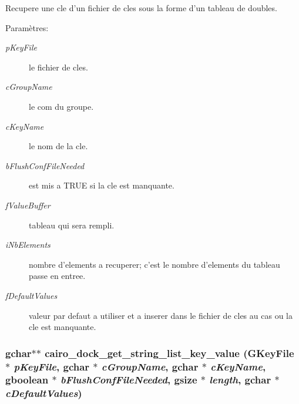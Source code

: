 Recupere une cle d'un fichier de cles sous la forme d'un tableau de doubles. \begin{Desc}
\item[Param\`{e}tres:]
\begin{description}
\item[{\em p\-Key\-File}]le fichier de cles. \item[{\em c\-Group\-Name}]le com du groupe. \item[{\em c\-Key\-Name}]le nom de la cle. \item[{\em b\-Flush\-Conf\-File\-Needed}]est mis a TRUE si la cle est manquante. \item[{\em f\-Value\-Buffer}]tableau qui sera rempli. \item[{\em i\-Nb\-Elements}]nombre d'elements a recuperer; c'est le nombre d'elements du tableau passe en entree. \item[{\em f\-Default\-Values}]valeur par defaut a utiliser et a inserer dans le fichier de cles au cas ou la cle est manquante. \end{description}
\end{Desc}
\subsubsection{\setlength{\rightskip}{0pt plus 5cm}gchar$\ast$$\ast$ cairo\_\-dock\_\-get\_\-string\_\-list\_\-key\_\-value (GKey\-File $\ast$ {\em p\-Key\-File}, gchar $\ast$ {\em c\-Group\-Name}, gchar $\ast$ {\em c\-Key\-Name}, gboolean $\ast$ {\em b\-Flush\-Conf\-File\-Needed}, gsize $\ast$ {\em length}, gchar $\ast$ {\em c\-Default\-Values})}\label{cairo-dock-config_8c_44da4d7a6a3acc79178ac1b1153f11d5}


